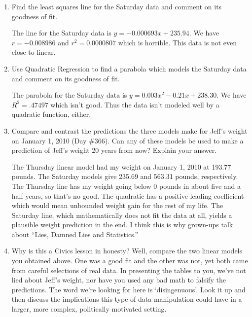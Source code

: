 \documentclass{ximera}
\begin{document}
\begin{problem}
\begin{enumerate}
\begin{solution}
    The line for the Thursday data is $y = -.12x + 237.69$.  We have $r = -.9568$ and $r^{2} = .9155$ so this is a really good fit.
\end{solution}

\item Find the least squares line for the Saturday data and comment on its goodness of fit.

\begin{solution}
    The line for the Saturday data is $y = -0.000693x + 235.94$.  We have $r = -0.008986$ and $r^{2} = 0.0000807$ which is horrible.  This data is not even close to linear.  
\end{solution}

\item Use Quadratic Regression to find a parabola which models the Saturday data and comment on its goodness of fit.

\begin{solution}
    The parabola for the Saturday data is $y = 0.003x^{2} - 0.21x + 238.30$.  We have $R^{2} = .47497$ which isn't good.  Thus the data isn't modeled well by a quadratic function, either.
\end{solution}

\item Compare and contrast the predictions the three models make for Jeff's weight on January 1, 2010 (Day \#366).  Can any of these models be used to make a prediction of Jeff's weight 20 years from now?  Explain your answer.

\begin{solution}
    The Thursday linear model had my weight on January 1, 2010 at 193.77 pounds.  The Saturday models give 235.69 and 563.31 pounds, respectively.  The Thursday line has my weight going below 0 pounds in about five and a half years, so that's no good.  The quadratic has a positive leading coefficient which would mean unbounded weight gain for the rest of my life.  The Saturday line, which mathematically does not fit the data at all, yields a plausible weight prediction in the end.  I think this is why grown-ups talk about ``Lies, Damned Lies and Statistics.''
\end{solution}

\item Why is this a Civics lesson in honesty?  Well, compare the two linear models you obtained above.  One was a good fit and the other was not, yet both came from careful selections of real data.  In presenting the tables to you, we've  not lied about Jeff's weight, nor have you used any bad math to falsify the predictions.  The word we're looking for here is `disingenuous'.  Look it up and then discuss the implications this type of data manipulation could have in a larger, more complex, politically motivated setting. 


\end{enumerate}

\end{problem}
\end{document}
